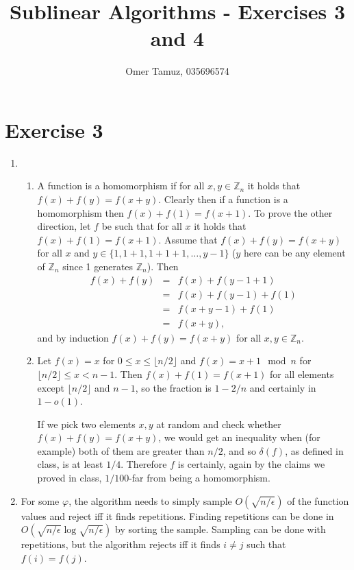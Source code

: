 \documentclass[11pt]{article} \usepackage{amssymb}
\newcommand{\Z}{\mathbb Z} \newcommand{\CalE}{{\mathcal{E}}}
\renewcommand{\phi}{\varphi}
\begin{document}
\title{Sublinear Algorithms - Exercises 3 and 4}

 \author{Omer Tamuz, 035696574}
\maketitle

\section{Exercise 3}
\begin{enumerate}
\item 
  \begin{enumerate}
  \item A function is a homomorphism if for all $x,y\in \Z_n$ it holds that 
    $f(x)+f(y)=f(x+y)$. Clearly then if a function is a homomorphism then
    $f(x)+f(1)=f(x+1)$. To prove the other direction, let $f$ be such that
    for all $x$ it holds that $f(x)+f(1)=f(x+1)$. Assume that 
    $f(x)+f(y)=f(x+y)$ for all $x$ and $y\in\{1,1+1,1+1+1,\ldots,y-1\}$ 
    ($y$ here can be any element of $\Z_n$ since 1 generates $\Z_n$). Then
    \begin{eqnarray*}
      f(x)+f(y)&=&f(x)+f(y-1+1)
      \\ &=& f(x)+f(y-1)+f(1)
      \\ &=& f(x+y-1)+f(1)
      \\ &=& f(x+y),
    \end{eqnarray*}
    and by induction $f(x)+f(y)=f(x+y)$ for all $x,y\in \Z_n$.
  \item
    Let $f(x)=x$ for $0\leq x\leq \lfloor n/2\rfloor$ and  
    $f(x)=x+1\mod n$ for $\lfloor n/2\rfloor\leq x < n-1$. Then $f(x)+f(1)=f(x+1)$ for all elements
    except $\lfloor n/2\rfloor$ and $n-1$, so the fraction is $1-2/n$ and certainly in
    $1-o(1)$. 

    If we pick two elements $x,y$  at random and check whether 
    $f(x)+f(y)=f(x+y)$, we would get an inequality when (for example) both
    of them are greater than $n/2$, and 
    so $\delta(f)$,  as defined in class, is at least $1/4$. 
    Therefore $f$ is certainly, again by 
    the claims we proved in class,  $1/100$-far from  being a homomorphism.
  \end{enumerate}
\item For some $\phi$, the algorithm needs to simply sample $O(\sqrt{n/\epsilon})$ 
  of the function
  values and reject iff it finds repetitions. Finding repetitions can be done in
  $O(\sqrt{n/\epsilon}\log \sqrt{n/\epsilon})$ by sorting the sample. Sampling can be done with repetitions,
  but the algorithm rejects iff it finds $i\neq j$ such that $f(i)=f(j)$.


\end{enumerate}
\end{document}
